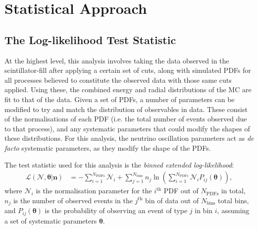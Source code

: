 \section{Statistical Approach}
\subsection{The Log-likelihood Test Statistic}\label{sec:test_statistic}
At the highest level, this analysis involves taking the data observed in the scintillator-fill after applying a certain set of cuts, along with simulated PDFs for all processes believed to constitute the observed data with those same cuts applied. Using these, the combined energy and radial distributions of the MC are fit to that of the data. Given a set of PDFs, a number of parameters can be modified to try and match the distribution of observables in data. These consist of the normalisations of each PDF (i.e. the total number of events observed due to that process), and any systematic parameters that could modify the shapes of these distributions. For this analysis, the neutrino oscillation parameters act as \textit{de facto} systematic parameters, as they modify the shape of the \beight{} PDFs.

The test statistic used for this analysis is the \textit{binned extended log-likelihood}:
\begin{align}
    \mathcal{L}\left(\bm{\mathcal{N}}, \bm{\theta} | \bm{n}\right) &=
    -\sum_{i=1}^{N_{\mathrm{PDFs}}}\mathcal{N}_{i} 
    + \sum_{j=1}^{N_{\mathrm{bins}}}n_{j}\ln{\left(\sum_{i=1}^{N_{\textrm{PDFs}}} \mathcal{N}_{i}P_{ij}\left(\bm{\theta}\right)\right)},%
\end{align}
where $\mathcal{N}_{i}$ is the normalisation parameter for the $i^{\mathrm{th}}$ PDF out of $N_{\mathrm{PDFs}}$ in total, $n_{j}$ is the number of observed events in the $j^{\mathrm{th}}$ bin of data out of $N_{\mathrm{bins}}$ total bins, and $P_{ij}\left(\bm{\theta}\right)$ is the probability of observing an event of type $j$ in bin $i$, assuming a set of systematic parameters $\bm{\theta}$.


